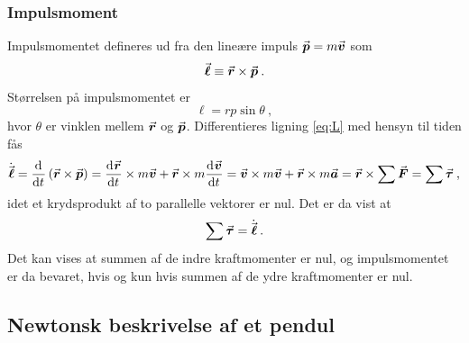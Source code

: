 
\subsubsection{Impulsmoment}
Impulsmomentet defineres ud fra den lineære impuls $\v{p}=m\v{v}$ som
%
\begin{equation} \label{eq:L}
    \v{\ell} \equiv \v{r}\times\v{p} \: .
\end{equation}
%
Størrelsen på impulsmomentet er
%
\begin{equation}
	\ell = rp\sin\theta \: ,
\end{equation}
%
hvor $\theta$ er vinklen mellem $\v{r}$ og $\v{p}$. Differentieres ligning \eqref{eq:L} med hensyn til tiden fås
\begin{equation}
    \dt{\v{\ell}} = \dif{t}{}\left(\v{r}\times\v{p}\right) = \dif{t}{\v{r}}\times m\v{v}+\v{r}\times m\dif{t}{\v{v}} = \v{v}\times m\v{v}+\v{r}\times m\v{a} = \v{r}\times\sum\v{F} = \sum\gv{\tau} \: ,
\end{equation}
idet et krydsprodukt af to parallelle vektorer er nul. Det er da vist at
\begin{equation} \label{eq:sum_tau_lig_aflede_impulsmoment}
    \sum\gv{\tau} = \dt{\v{\ell}} \: .
\end{equation}
Det kan vises at summen af de indre kraftmomenter er nul, og impulsmomentet er da bevaret, hvis og kun hvis summen af de ydre kraftmomenter er nul.

\subsection{Newtonsk beskrivelse af et pendul} \label{sec: Beskrivelse af pendul - Newton}

